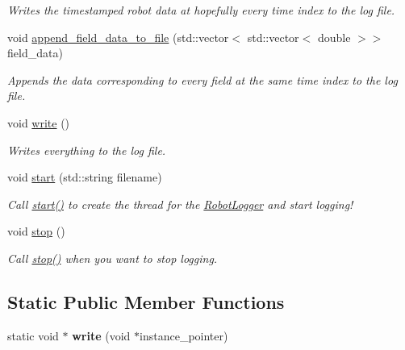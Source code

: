 \begin{DoxyCompactItemize}
\begin{DoxyCompactList}\small\item\em Writes the timestamped robot data at {\itshape hopefully} every time index to the log file. \end{DoxyCompactList}\item 
void \hyperlink{classrobot__interfaces_1_1RobotLogger_a70c988142c9ccbdc0c81b0bcc689031e}{append\+\_\+field\+\_\+data\+\_\+to\+\_\+file} (std\+::vector$<$ std\+::vector$<$ double $>$$>$ field\+\_\+data)
\begin{DoxyCompactList}\small\item\em Appends the data corresponding to every field at the same time index to the log file. \end{DoxyCompactList}\item 
void \hyperlink{classrobot__interfaces_1_1RobotLogger_a8dc63e66127923cfee3a2ddaf764da86}{write} ()
\begin{DoxyCompactList}\small\item\em Writes everything to the log file. \end{DoxyCompactList}\item 
void \hyperlink{classrobot__interfaces_1_1RobotLogger_a9abfad073fd735b9873b4b3f19f268e0}{start} (std\+::string filename)
\begin{DoxyCompactList}\small\item\em Call \hyperlink{classrobot__interfaces_1_1RobotLogger_a9abfad073fd735b9873b4b3f19f268e0}{start()} to create the thread for the \hyperlink{classrobot__interfaces_1_1RobotLogger}{Robot\+Logger} and start logging! \end{DoxyCompactList}\item 
void \hyperlink{classrobot__interfaces_1_1RobotLogger_a55ec7dcacd849adee53fa49a2a0c8234}{stop} ()\hypertarget{classrobot__interfaces_1_1RobotLogger_a55ec7dcacd849adee53fa49a2a0c8234}{}\label{classrobot__interfaces_1_1RobotLogger_a55ec7dcacd849adee53fa49a2a0c8234}

\begin{DoxyCompactList}\small\item\em Call \hyperlink{classrobot__interfaces_1_1RobotLogger_a55ec7dcacd849adee53fa49a2a0c8234}{stop()} when you want to stop logging. \end{DoxyCompactList}\end{DoxyCompactItemize}
\subsection*{Static Public Member Functions}
\begin{DoxyCompactItemize}
\item 
static void $\ast$ {\bfseries write} (void $\ast$instance\+\_\+pointer)\hypertarget{classrobot__interfaces_1_1RobotLogger_a909c3baf8d34945085fee9c45e9d80c4}{}\label{classrobot__interfaces_1_1RobotLogger_a909c3baf8d34945085fee9c45e9d80c4}

\end{DoxyCompactItemize}
